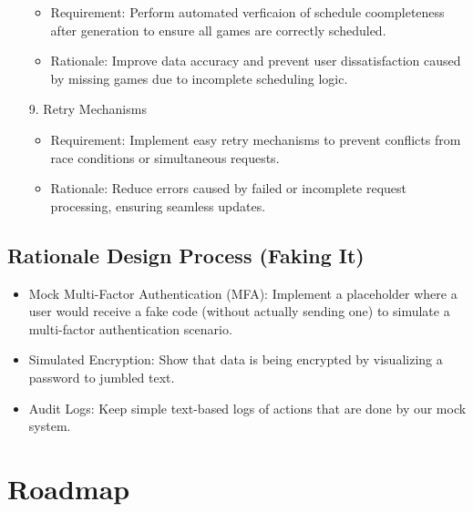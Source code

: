 \documentclass{article}
\begin{document}
\begin{enumerate}
        \begin{itemize}
            \item Requirement: Perform automated verficaion of schedule coompleteness after generation to ensure all games are correctly scheduled.
            \item Rationale: Improve data accuracy and prevent user dissatisfaction caused by missing games due to incomplete scheduling logic.
        \end{itemize}
    \item[9.] Retry Mechanisms
        \begin{itemize}
            \item Requirement: Implement easy retry mechanisms to prevent conflicts from race conditions or simultaneous requests.
            \item Rationale: Reduce errors caused by failed or incomplete request processing, ensuring seamless updates.
        \end{itemize}
\end{enumerate}

\subsection{Rationale Design Process (Faking It)}
\begin{itemize}
    \item Mock Multi-Factor Authentication (MFA): Implement a placeholder where a user would receive a fake code (without actually sending one) to simulate a multi-factor authentication scenario.
    \item Simulated Encryption: Show that data is being encrypted by visualizing a password to jumbled text. 
    \item Audit Logs: Keep simple text-based logs of actions that are done by our mock system.
\end{itemize}

\section{Roadmap}
\end{document}
